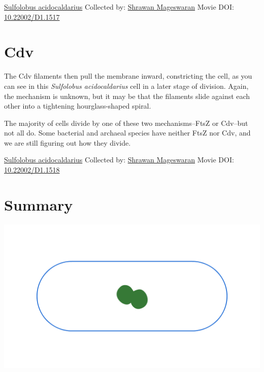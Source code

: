\documentclass[]{tufte-book}
\begin{document}
\hypertarget{htmlwidget-65a670f8ae4d9f1a4ccb}{}

\label{fig:5-11}\protect\hyperlink{tree}{Sulfolobus acidocaldarius} Collected by: \protect\hyperlink{shrawan_mageswaran}{Shrawan Mageswaran} Movie DOI: \href{https://doi.org/10.22002/D1.1517}{10.22002/D1.1517}

\hypertarget{cdv}{%
\section{Cdv}\label{cdv}}

The Cdv filaments then pull the membrane inward, constricting the cell, as you can see in this \emph{Sulfolobus acidocaldarius} cell in a later stage of division. Again, the mechanism is unknown, but it may be that the filaments slide against each other into a tightening hourglass-shaped spiral.

The majority of cells divide by one of these two mechanisms--FtsZ or Cdv--but not all do. Some bacterial and archaeal species have neither FtsZ nor Cdv, and we are still figuring out how they divide.



\hypertarget{htmlwidget-9cd61e7c61fc51f24623}{}

\label{fig:5-12}\protect\hyperlink{tree}{Sulfolobus acidocaldarius} Collected by: \protect\hyperlink{shrawan_mageswaran}{Shrawan Mageswaran} Movie DOI: \href{https://doi.org/10.22002/D1.1518}{10.22002/D1.1518}

\hypertarget{summary-4}{%
\section{Summary}\label{summary-4}}

\includegraphics{img/summaries/05_Division}
\end{document}
